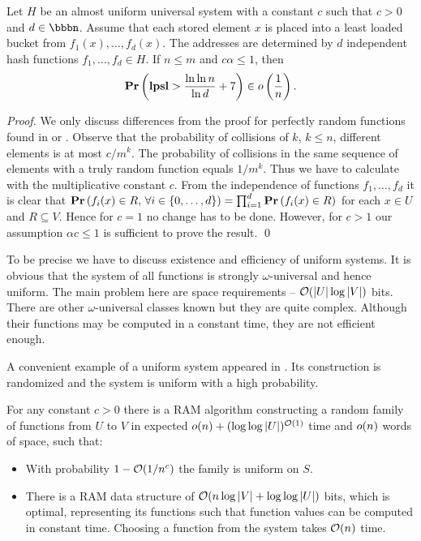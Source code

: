 \begin{theorem}
\label{theorem-universal-hashing-two-choices}
Let $H$ be an almost uniform universal system with a constant $c$ such that $c > 0$ and $d \in \bbbn$. Assume that each stored element $x$ is placed into a least loaded bucket from $f_1(x), \dots, f_d(x)$. The addresses are determined by $d$ independent hash functions $f_1, \dots, f_d \in H$. If $n \leq m$ and $c \alpha \leq 1$, then $$\mathbf{Pr}\left(\mathbf{lpsl} > \frac{\ln \ln n}{\ln d} + 7\right) \in o\left(\frac{1}{n}\right).$$
\end{theorem}
\begin{proof}
We only discuss differences from the proof for perfectly random functions found in \cite{Mitzenmacher:2005:PCR:1076315} or \cite{DBLP:conf/stoc/AzarBKU94}. Observe that the probability of collisions of $k$, $k \leq n$, different elements is at most ${c}/{m^k}$. The probability of collisions in the same sequence of elements with a truly random function equals ${1}/{m^k}$. Thus we have to calculate with the multiplicative constant $c$.
From the independence of functions $f_1, \dots, f_d$ it is clear that $\mathbf{Pr}\left(f_i(x) \in R,\, \forall i \in \{0, \dots, d\}\right) = \prod_{i = 1}^{d}\mathbf{Pr}\left(f_i(x) \in R\right)$ for each $x \in U$ and $R \subseteq V$. Hence for $c = 1$ no change has to be done. However, for $c > 1$ our assumption $\alpha c \leq 1$ is sufficient to prove the result.
\qed
\end{proof}

To be precise we have to discuss existence and efficiency of uniform systems. It is obvious that the system of all functions is strongly $\omega$-universal and hence uniform. The main problem here are space requirements -- $\mathcal{O}(|U| \log |V|)$ bits. There are other $\omega$-universal classes known but they are quite complex. Although their functions may be computed in a constant time, they are not efficient enough. 

A convenient example of a uniform system appeared in \cite{DBLP:journals/siamcomp/PaghP08}. Its construction is randomized and the system is uniform with a high probability.
\begin{theorem}
\label{theorem-uniform-system}
For any constant $c > 0$ there is a RAM algorithm constructing a random family of functions from $U$ to $V$ in expected $o(n) + (\log \log|U|)^{\mathcal{O}(1)}$ time and $o(n)$ words of space, such that:
\begin{itemize}
\item With probability $1 - \mathcal{O}(1 / n^c)$ the family is uniform on $S$.
\item There is a RAM data structure of $\mathcal{O}(n \log|V| + \log \log|U|)$ bits, which is optimal, representing its functions such that function values can be computed in constant time. Choosing a function from the system takes $\mathcal{O}(n)$ time.
\end{itemize}
\end{theorem}

